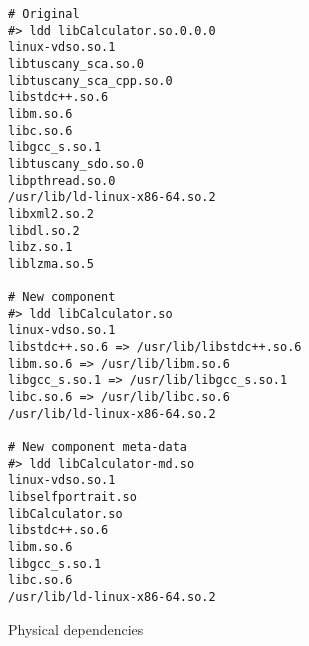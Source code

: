 \begin{listing}
\begin{verbatim}
# Original
#> ldd libCalculator.so.0.0.0 
linux-vdso.so.1
libtuscany_sca.so.0
libtuscany_sca_cpp.so.0
libstdc++.so.6
libm.so.6
libc.so.6
libgcc_s.so.1
libtuscany_sdo.so.0
libpthread.so.0
/usr/lib/ld-linux-x86-64.so.2
libxml2.so.2
libdl.so.2
libz.so.1
liblzma.so.5

# New component
#> ldd libCalculator.so 
linux-vdso.so.1
libstdc++.so.6 => /usr/lib/libstdc++.so.6
libm.so.6 => /usr/lib/libm.so.6
libgcc_s.so.1 => /usr/lib/libgcc_s.so.1
libc.so.6 => /usr/lib/libc.so.6
/usr/lib/ld-linux-x86-64.so.2

# New component meta-data
#> ldd libCalculator-md.so 
linux-vdso.so.1
libselfportrait.so
libCalculator.so
libstdc++.so.6
libm.so.6
libgcc_s.so.1
libc.so.6
/usr/lib/ld-linux-x86-64.so.2
 \end{verbatim}
\caption{Physical dependencies}
\label{lst:deps}
\end{listing}




